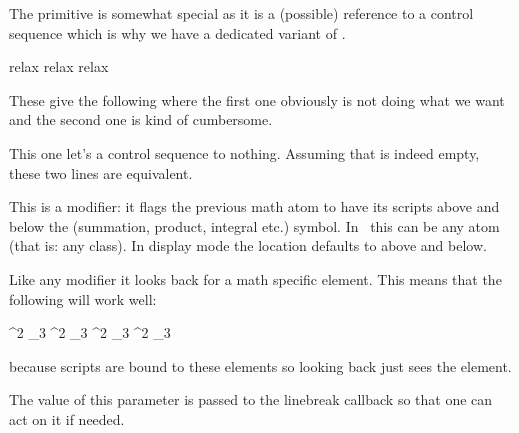 The  primitive is somewhat special as it is a (possible)
reference to  a control sequence which is why we have a dedicated variant of
.

\startbuffer
\csname relax\endcsname\let                         \foo\lastnamedcs \meaning\foo
\csname relax\endcsname\expandafter\let\expandafter \oof\lastnamedcs \meaning\oof
\csname relax\endcsname{}            \ofo             \meaning\ofo
\stopbuffer

\typebuffer %

These give the following where the first one obviously is not doing what we want
and the second one is kind of cumbersome.

\startlines
\getbuffer
\stoplines

\stopnewprimitive

\startnewprimitive[title={\prm {lettonothing}}]

This one let's a control sequence to nothing. Assuming that \type {\empty}
is indeed empty, these two lines are equivalent.

\starttyping
\let         \foo\empty
{}\oof
\stoptyping

\stopnewprimitive

\startoldprimitive[title={\prm {limits}}]

This is a modifier: it flags the previous math atom to have its scripts above and
below the (summation, product, integral etc.) symbol. In \LUAMETATEX\ this can be
any atom (that is: any class). In display mode the location defaults to above and
below.

Like any modifier it looks back for a math specific element. This means that the
following will work well:

\starttyping
\sum \limits ^2 _3
\sum ^2 \limits _3
\sum ^2 _3 \limits
\sum ^2 _3 \limits \nolimits \limits
\stoptyping

because scripts are bound to these elements so looking back just sees the element.

\stopoldprimitive

\startnewprimitive[title={\prm {linebreakchecks}}]

The value of this parameter is passed to the linebreak callback so that one can
act on it if needed.

\stopnewprimitive

\startnewprimitive[title={\prm {linebreakoptional}}]


